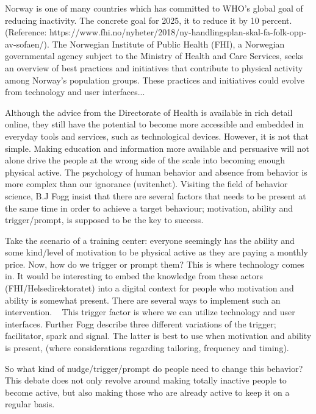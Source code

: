 Norway is one of many countries which has committed to WHO's global goal of reducing inactivity. The concrete goal for 2025, it to reduce it by 10 percent. (Reference: https://www.fhi.no/nyheter/2018/ny-handlingsplan-skal-fa-folk-opp-av-sofaen/). The Norwegian Institute of Public Health (FHI), a Norwegian governmental agency subject to the Ministry of Health and Care Services, seeks an overview of best practices and initiatives that contribute to physical activity among Norway's population groups. 
These practices and initiatives could evolve from technology and user interfaces...

Although the advice from the Directorate of Health is available in rich detail online, they still have the potential to become more accessible and embedded in everyday tools and services, such as technological devices. However, it is not that simple. Making education and information more available and persuasive will not alone drive the people at the wrong side of the scale into becoming enough physical active. The psychology of human behavior and absence from behavior is more complex than our ignorance (uvitenhet). Visiting the field of behavior science, B.J Fogg insist that there are several factors that needs to be present at the same time in order to achieve a target behaviour; motivation, ability and trigger/prompt, is supposed to be the key to success. 

Take the scenario of a training center: everyone seemingly has the ability and some kind/level of motivation to be physical active as they are paying a monthly price. Now, how do we trigger or prompt them?  This is where technology comes in. It would be interesting to embed the knowledge from these actors (FHI/Helsedirektoratet) into a digital context for people who motivation and ability is somewhat present. There are several ways to implement such an intervention. 
 
This trigger factor is where we can utilize technology and user interfaces. Further Fogg describe three different variations of the trigger; facilitator, spark and signal. The latter is best to use when motivation and ability is present, (where considerations regarding tailoring, frequency and timing).


So what kind of nudge/trigger/prompt do people need to change this behavior? This debate does not only revolve around making totally inactive people to become active, but also making those who are already active to keep it on a regular basis. 

